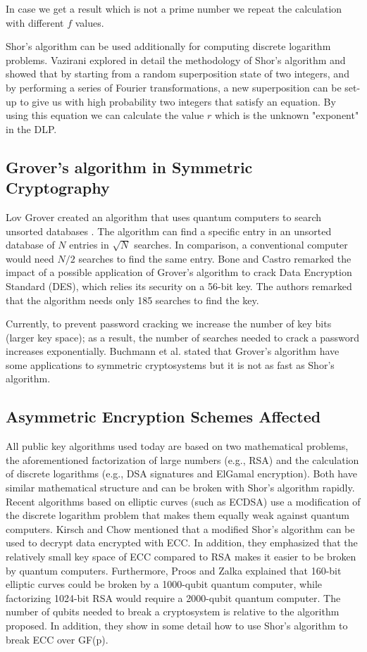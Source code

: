 \documentclass[conference, letterpaper]{IEEEtran}
\begin{document}
In case we get a result which is not a prime number we repeat the calculation with different $f$ values.

Shor’s algorithm can be used additionally for computing discrete logarithm problems. Vazirani \cite{Vazirani1997} explored in detail the methodology of Shor’s algorithm and showed that by starting from a random superposition state of two integers, and by performing a series of Fourier transformations, a new superposition can be set-up to give us with high probability two integers that satisfy an equation. By using this equation we can calculate the value $r$ which is the unknown "exponent" in the DLP.


\subsection{Grover's algorithm in Symmetric Cryptography}
Lov Grover created an algorithm that uses quantum computers to search unsorted databases \cite{Grover1996}. The algorithm can find a specific entry in an unsorted database of $N$ entries in $\sqrt{N}$ searches. In comparison, a conventional computer would need $N/2$ searches to find the same entry.
Bone and Castro \cite{Bone1997} remarked the impact of a possible application of Grover’s algorithm to crack Data Encryption Standard (DES), which relies its security on a 56-bit key. The authors remarked that the algorithm needs only 185 searches to find the key. 

Currently, to prevent password cracking we increase the number of key bits (larger key space); as a result, the number of searches needed to crack a password increases exponentially. 
Buchmann et al. \cite{Buchmann2010} stated that Grover’s algorithm have some applications to symmetric cryptosystems but it is not as fast as Shor’s algorithm. 

\subsection{Asymmetric Encryption Schemes Affected}
All public key algorithms used today are based on two mathematical problems, the aforementioned factorization of large numbers (e.g., RSA) and the calculation of discrete logarithms (e.g., DSA signatures and ElGamal encryption). Both have similar mathematical structure and can be broken with Shor's algorithm rapidly. Recent algorithms based on elliptic curves (such as ECDSA) use a modification of the discrete logarithm problem that makes them equally weak against quantum computers. Kirsch and Chow \cite{Kirsch2015} mentioned that a modified Shor's algorithm can be used to decrypt data encrypted with ECC. In addition, they emphasized that the relatively small key space of ECC compared to RSA makes it easier to be broken by quantum computers. Furthermore, Proos and Zalka \cite{Proos2003} explained that 160-bit elliptic curves could be broken by a 1000-qubit quantum computer, while factorizing 1024-bit RSA would require a 2000-qubit quantum computer. The number of qubits needed to break a cryptosystem is relative to the algorithm proposed. In addition, they show in some detail how to use Shor’s algorithm to break ECC over GF(p).
\end{document}
